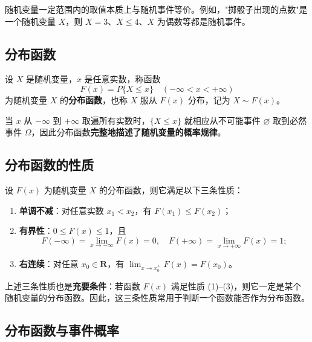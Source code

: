 \documentclass[lang=cn,11pt]{elegantbook}
\begin{document}
\begin{note}
随机变量一定范围内的取值本质上与随机事件等价。例如，"掷骰子出现的点数"是一个随机变量 \(X\)，则 \(X=3\)、\(X \le 4\)、\(X\) 为偶数等都是随机事件。
\end{note}

\subsection{分布函数}

\begin{definition}[分布函数] \label{def:distribution-function}
设 \(X\) 是随机变量，\(x\) 是任意实数，称函数
\[
F(x) = P\{X \le x\} \quad (-\infty < x < +\infty)
\]
为随机变量 \(X\) 的\textbf{分布函数}，也称 \(X\) 服从 \(F(x)\) 分布，记为 \(X \sim F(x)\)。
\end{definition}

当 \(x\) 从 \(-\infty\) 到 \(+\infty\) 取遍所有实数时，\(\{X \le x\}\) 就相应从不可能事件 \(\varnothing\) 取到必然事件 \(\Omega\)，因此分布函数\textbf{完整地描述了随机变量的概率规律}。


\subsection{分布函数的性质}

\begin{property}\label{prop:distribution-function}
设 \(F(x)\) 为随机变量 \(X\) 的分布函数，则它满足以下三条性质：
\begin{enumerate}
    \item \textbf{单调不减}：对任意实数 \(x_1 < x_2\)，有 \(F(x_1) \le F(x_2)\)；
    \item \textbf{有界性}：\(0 \le F(x) \le 1\)，且
    \[
    F(-\infty) = \lim_{x \to -\infty} F(x) = 0, \quad F(+\infty) = \lim_{x \to +\infty} F(x) = 1;
    \]
    \item \textbf{右连续}：对任意 \(x_0 \in \mathbf{R}\)，有 \(\lim_{x \to x_0^+} F(x) = F(x_0)\)。
\end{enumerate}
\end{property}

\begin{remark}
上述三条性质也是\textbf{充要条件}：若函数 \(F(x)\) 满足性质 (1)--(3)，则它一定是某个随机变量的分布函数。因此，这三条性质常用于判断一个函数能否作为分布函数。
\end{remark}


\subsection{分布函数与事件概率}
\end{document}
